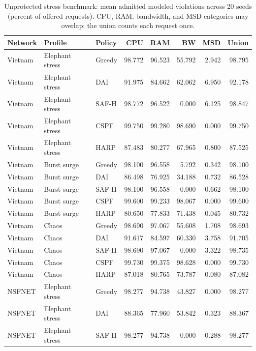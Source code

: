 \documentclass[final,5p]{elsarticle}
\begin{document}
\begin{table}[p]
\centering
\caption{Unprotected stress benchmark: mean admitted modeled violations across 20 seeds (percent of offered requests). CPU, RAM, bandwidth, and MSD categories may overlap; the union counts each request once.}
\label{tab:unprotected_stress}
\scriptsize
\begin{tabular}{lllrrrrr}
\toprule
Network & Profile & Policy & CPU & RAM & BW & MSD & Union \\
\midrule
Vietnam & Elephant stress & Greedy & 98.772 & 96.523 & 55.792 & 2.942 & 98.795 \\
Vietnam & Elephant stress & DAI & 91.975 & 84.662 & 62.062 & 6.950 & 92.178 \\
Vietnam & Elephant stress & SAF-H & 98.772 & 96.522 & 0.000 & 6.125 & 98.847 \\
Vietnam & Elephant stress & CSPF & 99.750 & 99.280 & 98.690 & 0.000 & 99.750 \\
Vietnam & Elephant stress & HARP & 87.483 & 80.277 & 67.965 & 0.800 & 87.525 \\
Vietnam & Burst surge & Greedy & 98.100 & 96.558 & 5.792 & 0.342 & 98.100 \\
Vietnam & Burst surge & DAI & 86.498 & 76.925 & 34.188 & 0.732 & 86.528 \\
Vietnam & Burst surge & SAF-H & 98.100 & 96.558 & 0.000 & 0.662 & 98.100 \\
Vietnam & Burst surge & CSPF & 99.600 & 99.233 & 98.067 & 0.000 & 99.600 \\
Vietnam & Burst surge & HARP & 80.650 & 77.833 & 71.438 & 0.045 & 80.732 \\
Vietnam & Chaos & Greedy & 98.690 & 97.067 & 55.608 & 1.708 & 98.693 \\
Vietnam & Chaos & DAI & 91.617 & 84.597 & 60.330 & 3.758 & 91.705 \\
Vietnam & Chaos & SAF-H & 98.690 & 97.067 & 0.000 & 3.322 & 98.735 \\
Vietnam & Chaos & CSPF & 99.730 & 99.375 & 98.628 & 0.000 & 99.730 \\
Vietnam & Chaos & HARP & 87.018 & 80.765 & 73.787 & 0.080 & 87.082 \\
NSFNET & Elephant stress & Greedy & 98.277 & 94.738 & 43.827 & 0.000 & 98.277 \\
NSFNET & Elephant stress & DAI & 88.365 & 77.960 & 53.842 & 0.323 & 88.367 \\
NSFNET & Elephant stress & SAF-H & 98.277 & 94.738 & 0.000 & 0.288 & 98.277 \\

\end{tabular}
\end{table}
\end{document}

